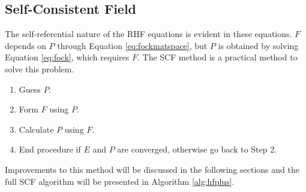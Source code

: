 \documentclass[final,3p,times,twocolumn]{elsarticle}
\begin{document}
\subsection{Self-Consistent Field} \label{sec:scf}


The self-referential nature of the RHF equations is evident in these equations. $F$ depends on $P$ through Equation \eqref{eq:fockmatspace}, but $P$ is obtained by solving Equation \eqref{eq:fock}, which requires $F$. The SCF method is a practical method to solve this problem.
\begin{enumerate}
	\item Guess $P$.
	\item Form $F$ using $P$.
	\item Calculate $P$ using $F$.
	\item End procedure if $E$ and $P$ are converged, otherwise go back to Step 2.
\end{enumerate}
Improvements to this method will be discussed in the following sections and the full SCF algorithm will be presented in Algorithm \ref{alg:hfplus}.
\end{document}
